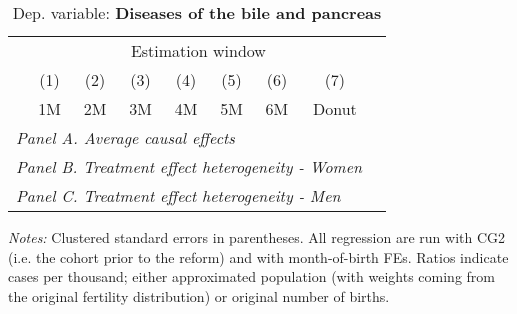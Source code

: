  \begin{table}[H] \begin{threeparttable} \centering \caption{Dep. variable: \textbf{Diseases of the bile and pancreas}} {\def\sym#1{\ifmmode^{#1}\else\(^{#1}\)\fi} \begin{tabular}{l*{8}{c}} \toprule & \multicolumn{7}{c}{Estimation window} \\ \cmidrule(lr){2-8}
            &\multicolumn{1}{c}{(1)}&\multicolumn{1}{c}{(2)}&\multicolumn{1}{c}{(3)}&\multicolumn{1}{c}{(4)}&\multicolumn{1}{c}{(5)}&\multicolumn{1}{c}{(6)}&\multicolumn{1}{c}{(7)}\\
            &\multicolumn{1}{c}{1M}&\multicolumn{1}{c}{2M}&\multicolumn{1}{c}{3M}&\multicolumn{1}{c}{4M}&\multicolumn{1}{c}{5M}&\multicolumn{1}{c}{6M}&\multicolumn{1}{c}{Donut}\\
\midrule
 \multicolumn{8}{l}{\emph{Panel A. Average causal effects}} \\       \midrule\multicolumn{8}{l}{\emph{Panel B. Treatment effect heterogeneity - Women}} \\       \midrule\multicolumn{8}{l}{\emph{Panel C. Treatment effect heterogeneity - Men}} \\       
\bottomrule \end{tabular} } \begin{tablenotes} \item \scriptsize \emph{Notes:} Clustered standard errors in parentheses. All regression are run with CG2 (i.e. the cohort prior to the reform) and with month-of-birth FEs. Ratios indicate cases per thousand; either approximated population (with weights coming from the original fertility distribution) or original number of births. \end{tablenotes} \end{threeparttable} \end{table} 
